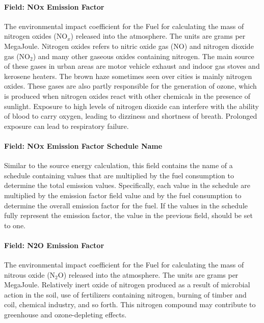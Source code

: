 \paragraph{Field: NOx Emission Factor}\label{field-nox-emission-factor}

The environmental impact coefficient for the Fuel for calculating the mass of nitrogen oxides (NO\(_{x}\)) released into the atmosphere. The units are grams per MegaJoule. Nitrogen oxides refers to nitric oxide gas (NO) and nitrogen dioxide gas (NO\(_{2}\)) and many other gaseous oxides containing nitrogen. The main source of these gases in urban areas are motor vehicle exhaust and indoor gas stoves and kerosene heaters. The brown haze sometimes seen over cities is mainly nitrogen oxides. These gases are also partly responsible for the generation of ozone, which is produced when nitrogen oxides react with other chemicals in the presence of sunlight. Exposure to high levels of nitrogen dioxide can interfere with the ability of blood to carry oxygen, leading to dizziness and shortness of breath. Prolonged exposure can lead to respiratory failure.

\paragraph{Field: NOx Emission Factor Schedule Name}\label{field-nox-emission-factor-schedule-name}

Similar to the source energy calculation, this field contains the name of a schedule containing values that are multiplied by the fuel consumption to determine the total emission values. Specifically, each value in the schedule are multiplied by the emission factor field value and by the fuel consumption to determine the overall emission factor for the fuel. If the values in the schedule fully represent the emission factor, the value in the previous field, should be set to one.

\paragraph{Field: N2O Emission Factor}\label{field-n2o-emission-factor}

The environmental impact coefficient for the Fuel for calculating the mass of nitrous oxide (N\(_{2}\)O) released into the atmosphere. The units are grams per MegaJoule. Relatively inert oxide of nitrogen produced as a result of microbial action in the soil, use of fertilizers containing nitrogen, burning of timber and coil, chemical industry, and so forth. This nitrogen compound may contribute to greenhouse and ozone-depleting effects.

